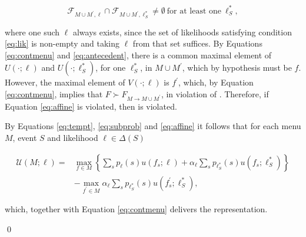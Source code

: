 \begin{equation}\label{eq:antecedent}
	\mathcal{F}_{M \cup M^{\prime}, \ell} \cap \mathcal{F}_{M \cup M^{\prime}, \ell^{*}_{S}} \neq \emptyset \: \text{for at least one} \: \ell_{S}^{*} ,
\end{equation}

where one such \( \ell \) always exists, since the set of likelihoods satisfying condition \eqref{eq:lik} is non-empty and taking \( \ell \) from that set suffices. By Equations \eqref{eq:contmenu} and \eqref{eq:antecedent}, there is a common maximal element of \( U \left( \cdot ; \ell \right) \) and \( U \left( \cdot ; \ell^{*}_{S} \right) \), for one \( \ell_S^{*} \), in \( M \cup M^{\prime} \), which by hypothesis must be \( f \). However, the maximal element of \( V \left( \cdot ; \ell \right) \) is \( f^{\prime} \), which, by Equation \eqref{eq:contmenu}, implies that \( F \succ F_{M \rightarrow M \cup M^{\prime}} \), in violation of . Therefore, if Equation \eqref{eq:affine} is violated, then  is violated.

By Equations \eqref{eq:tempt}, \eqref{eq:subprob} and \eqref{eq:affine} it follows that for each menu \( M \), event \( S \) and likelihood \( \ell \in \Delta \left( S \right) \)

\begin{equation}\label{eq:finproof}
	\begin{aligned}
		\mathcal{U} \left(M ; \ell \right) = & \max _{f \in M}\left\{\sum_{s} p_{\ell} \left( s \right) u \left( f_{s} ; \ell \right) +\alpha_{\ell} \sum_{s} p_{\ell^{*}_{S}} \left( s \right) u \left( f_{s} ; \ell^{*}_{S} \right) \right\} \\
		                                     & -\max_{f^{\prime} \in M} \alpha _{\ell} \sum_{s} p_{\ell^{*}_{S}} \left( s \right) u\left(f^{\prime}_{s} ; \ell^{*}_{S} \right) ,
	\end{aligned}
\end{equation}

which, together with Equation \eqref{eq:contmenu} delivers the representation.

\qed

